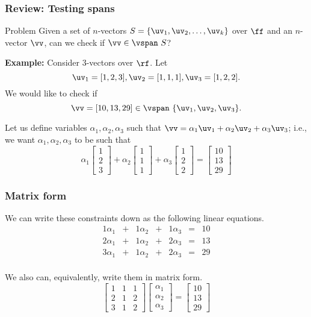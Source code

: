 \begin{frame}
  \frametitle{Review: Testing spans}

  \begin{block}{Problem}
    Given a set of $n$-vectors $S=\{\uv_1,\uv_2,\ldots,\uv_k\}$ over
    $\ff$ and an $n$-vector $\vv$, can we check if $\vv\in\vspan~S$?
  \end{block}

  {\small
  {\bf Example:}
  Consider $3$-vectors over $\rf$.  Let
  \[
  \uv_1=[1,2,3],
  \uv_2=[1,1,1], \uv_3=[1,2,2].
  \]
  We would like to check if
  \[
  \vv=[10,13,29]\in\vspan~\{\uv_1,\uv_2,\uv_3\}.
  \]

  Let us define variables $\alpha_1,\alpha_2,\alpha_3$ such that
  $\vv=\alpha_1\uv_1 + \alpha_2\uv_2 + \alpha_3\uv_3$; i.e., we want
  $\alpha_1,\alpha_2,\alpha_3$ to be such that
\[
\alpha_1
\begin{bmatrix}
  1 \\
  2 \\
  3
\end{bmatrix}
+
\alpha_2
\begin{bmatrix}
  1 \\
  1 \\
  1
\end{bmatrix}
+
\alpha_3
\begin{bmatrix}
  1 \\
  2 \\
  2
\end{bmatrix}
=
\begin{bmatrix}
  10 \\
  13 \\
  29
\end{bmatrix}
\]
}
\end{frame}

\begin{frame}
  \frametitle{Matrix form}
  
We can write these constraints down as the following linear equations.
\[
\begin{array}{ccccccl}
  1\alpha_1 &+& 1\alpha_2 &+& 1\alpha_3 &=& 10\\
  2\alpha_1 &+& 1\alpha_2 &+& 2\alpha_3 &=& 13\\
  3\alpha_1 &+& 1\alpha_2 &+& 2\alpha_3 &=& 29\\
\end{array}
\]

We also can, equivalently, write them in matrix form.
\[
\begin{bmatrix}
  1 & 1 & 1 \\
  2 & 1 & 2 \\
  3 & 1 & 2
\end{bmatrix}
\begin{bmatrix}
  \alpha_1 \\
  \alpha_2 \\
  \alpha_3
\end{bmatrix}
=
\begin{bmatrix}
  10 \\
  13 \\
  29
\end{bmatrix}
\]
\end{frame}

